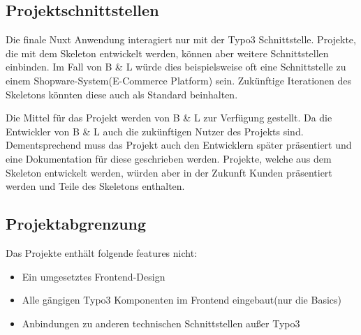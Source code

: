 \subsection{Projektschnittstellen} 
\label{sec:Projektschnittstellen}

Die finale Nuxt Anwendung interagiert nur mit der Typo3 Schnittstelle. Projekte, die mit dem Skeleton entwickelt werden, können aber weitere Schnittstellen einbinden. Im Fall von B \& L würde dies beispielsweise oft eine Schnittstelle zu einem Shopware-System(E-Commerce Platform) sein. Zukünftige Iterationen des Skeletons könnten diese auch als Standard beinhalten.

Die Mittel für das Projekt werden von  B \& L zur Verfügung gestellt. Da die Entwickler von B \& L auch die zukünftigen Nutzer des Projekts sind. Dementsprechend muss das Projekt auch den Entwicklern später präsentiert und eine Dokumentation für diese geschrieben werden. Projekte, welche aus dem Skeleton entwickelt werden, würden aber in der Zukunft Kunden präsentiert werden und Teile des Skeletons enthalten.


\subsection{Projektabgrenzung} 
\label{sec:Projektabgrenzung}

Das Projekte enthält folgende features nicht:

\begin{itemize}
	\item Ein umgesetztes Frontend-Design
	\item Alle gängigen Typo3 Komponenten im Frontend eingebaut(nur die Basics)
	\item Anbindungen zu anderen technischen Schnittstellen außer Typo3
\end{itemize}
